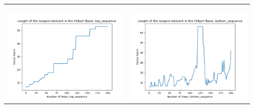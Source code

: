 \documentclass[10pt]{article}
\begin{document}
\begin{tabular}{c|c}
\begin{minipage}{.45\textwidth}
\end{minipage} \\ \\
\hline \\\begin{minipage}{.45\textwidth}
\includegraphics[width=\textwidth]{"DATA/5d/6 generators 2 bound I/top_sequence LENGTH"}
\end{minipage} &
\begin{minipage}{.45\textwidth}
\includegraphics[width=\textwidth]{"DATA/5d/6 generators 2 bound I bottomup/bottom_sequence LENGTH"}
\end{minipage}
\end{tabular}
\end{document}

